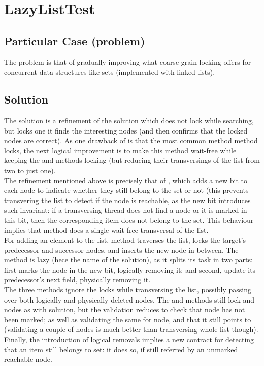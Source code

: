 \newpage
\section{\textbf{LazyListTest}}

\subsection{Particular Case (problem)}
The problem is that of gradually improving what coarse grain locking
offers for concurrent data structures like sets (implemented with
linked lists).

\subsection{Solution}
The  solution is a refinement of the 
solution which does not lock while searching, but locks one it finds
the interesting nodes (and then confirms that the locked nodes are
correct). As one drawback of  is that the most
common method  method locks, the next logical improvement
is to make this method wait-free while keeping the  and
 methods locking (but reducing their transversings of the
list from two to just one). \\

The refinement mentioned above is precisely that of ,
which adds a new bit to each node to indicate whether they still
belong to the set or not (this prevents transvering the list to detect
if the node is reachable, as the new bit introduces such invariant: if
a transversing thread does not find a node or it is marked in this
bit, then the corresponding item does not belong to the set. This
behaviour implies that  method does a single wait-free
transversal of the list. \\

For adding an element to the list,  method traverses the list,
locks the target's predecessor and successor nodes, and inserts the
new node in between. The    
method is lazy (hece the name of the solution), as it splits its task in
two parts: first marks the node in the new bit, logically removing it;
and second, update its predecessor's next field, physically removing
it. \\

The three methods ignore the locks while transversing the list,
possibly passing over both logically and physically deleted nodes. The
 and  methods still lock  and  nodes
as with  solution, but the validation reduces to
check that  node has not been marked; as well as validating
the same for  node, and that it still points to 
(validating a couple of nodes is much better than transversing whole
list though). Finally, the introduction of logical removals implies a
new contract for detecting that an item still belongs to set: it does
so, if still referred by an unmarked reachable node. \\

